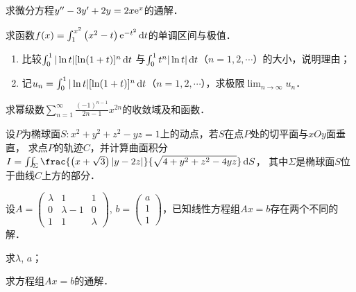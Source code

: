 \documentclass[plain,noanswer,medmath]{../../template/jnuexam}
\begin{document}


\begin{problem}[points=10]
求微分方程$y'' - 3y' + 2y = 2x\mathrm{e}^x$的通解．
\end{problem}


\begin{problem}[points=10]
求函数$f(x) = \int_1^{x^2} \left(x^2 - t \right) \mathrm{e}^{- t^2} \mathop{}\!\mathrm{d} t$的单调区间与极值．
\end{problem}


\begin{problem}[points=10]
\begin{enumerate}
\item
比较$\int_0^1 |\ln t|[\ln(1+t)]^n\mathop{}\!\mathrm{d} t$
与$\int_0^1 t^n |\ln t|\mathop{}\!\mathrm{d} t$（$n=1,2,\cdots$）的大小，说明理由；
\item
记$u_n = \int_0^1 |\ln t|[\ln(1+t)]^n\mathop{}\!\mathrm{d} t$（$n=1,2,\cdots$），求极限$\lim_{n\to\infty} u_n$．
\end{enumerate}
\end{problem}


\begin{problem}[points=10]
求幂级数$\sum_{n = 1}^{\infty}\frac{(- 1)^{n - 1}}{2n - 1}x^{2n}$的收敛域及和函数．
\end{problem}


\begin{problem}[points=10]
设$P$为椭球面$S: x^2 + y^2 + z^2 - yz = 1$上的动点，若$S$在点$P$处的切平面与$xOy$面垂直，
求点$P$的轨迹$C$，并计算曲面积分
$I = \iint_{\Sigma}\frac{\left(x + \sqrt{3} \right)|y - 2z|}{\sqrt{4 + y^2 + z^2 - 4yz}} \dS$，
其中$\Sigma$是椭球面$S$位于曲线$C$上方的部分．
\end{problem}


\begin{problem}[points=11]
设$A = \begin{pmatrix}
  \lambda & 1           & 1 \\
  0       & \lambda - 1 & 0 \\
  1       & 1           & \lambda
\end{pmatrix}$, $b = \begin{pmatrix}
  a \\
  1 \\
  1
\end{pmatrix}$，已知线性方程组$Ax = b$存在两个不同的解．\par
\begin{enumerate*}
\item 求$\lambda$, $a$；
\item 求方程组$Ax = b$的通解．
\end{enumerate*}
\end{problem}
\end{document}
